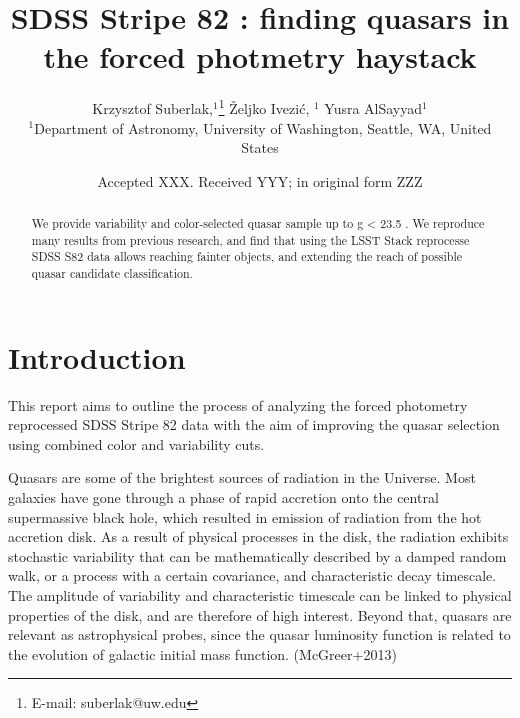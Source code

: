 \documentclass[fleqn,usenatbib]{mnras}  %
\title[SDSS Quasars]{SDSS Stripe 82 : finding quasars in the forced photmetry haystack}
\author[K. Suberlak et al.]{
Krzysztof Suberlak,$^{1}$\thanks{E-mail: suberlak@uw.edu}
\v{Z}eljko Ivezi\'c, $^{1}$
Yusra AlSayyad$^{1}$ 
\\
$^{1}$Department of Astronomy, University of Washington, Seattle, WA, United States\\
}
\date{Accepted XXX. Received YYY; in original form ZZZ}
\begin{document}
\label{firstpage}
\pagerange{\pageref{firstpage}--\pageref{lastpage}}
\maketitle

\begin{abstract}
We provide variability and color-selected quasar sample up to g < 23.5 . We reproduce many results from previous research, and find that using the LSST Stack reprocesse SDSS S82 data allows reaching fainter objects, and extending the reach of possible quasar candidate classification. 

\end{abstract}




\section{Introduction}
\label{sec:intro}

This report aims to outline the process of analyzing the forced photometry reprocessed SDSS Stripe 82 data with the aim of improving the quasar selection using combined color and variability cuts. 

Quasars are some of the brightest sources of radiation in the Universe. Most galaxies have gone through a phase of rapid accretion onto the central supermassive black hole, which resulted in emission of radiation from the hot accretion disk. As a result of physical processes in the disk, the radiation exhibits stochastic variability that can be mathematically described by a damped random walk,  or a process with a certain covariance, and characteristic decay timescale. The amplitude of variability and characteristic timescale can be linked to physical properties of the disk, and are therefore of high interest.  Beyond that, quasars are relevant as astrophysical probes,  since the quasar luminosity function is related to the evolution of galactic initial mass function.  (McGreer+2013)
\end{document}

